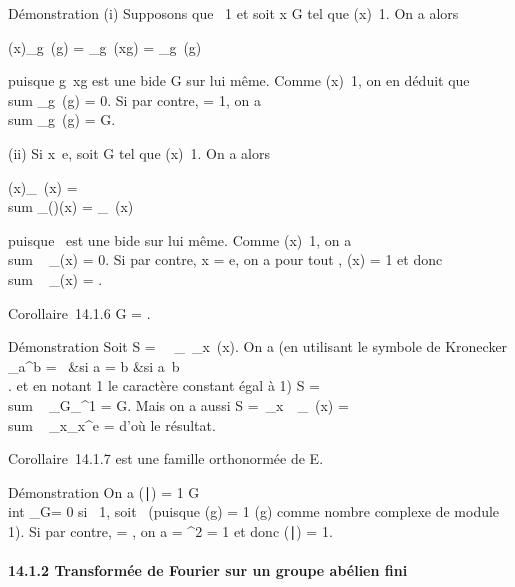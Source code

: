 \documentclass[]{article}
\begin{document}
Démonstration (i) Supposons que \chi\neq~1 et soit x
\in G tel que \chi(x)\neq~1. On a alors

\chi(x)\sum \_g\inG~\chi(g) =
\sum \_g\inG~\chi(xg) =
\sum \_g\inG~\chi(g)

puisque g\mapsto~xg est une bi\jmathection de G sur lui
même. Comme \chi(x)\neq~1, on en déduit que
\\sum  \_g\inG~\chi(g)
= 0. Si par contre, \chi = 1, on a
\\sum  \_g\inG~\chi(g)
= \textbar{}G\textbar{}.

(ii) Si x\neq~e, soit \phi \in\hat
G tel que \phi(x)\neq~1. On a alors

\phi(x)\sum \_\chi\in\hatG~\chi(x)
= \\sum
\_\chi\in\hatG(\phi\chi)(x) =
\sum \_\chi\in\hatG~\chi(x)

puisque \chi\mapsto~\phi\chi est une bi\jmathection de
\hatG sur lui même. Comme
\phi(x)\neq~1, on a
\\sum ~
\_\chi\in\hatG\chi(x) = 0. Si par contre, x = e, on a
pour tout \chi, \chi(x) = 1 et donc
\\sum ~
\_\chi\in\hatG\chi(x) =
\textbar{}\hatG\textbar{}.

Corollaire~14.1.6 \textbar{}G\textbar{} =
\textbar{}\hatG\textbar{}.

Démonstration Soit S =\
\sum ~
\_\chi\in\hatG\
\sum  \_x\inG~\chi(x). On a (en utilisant le
symbole de Kronecker \delta\_a^b = \left
\ \cases 1&si a = b
&si a\neq~b\\ 
\right . et en notant 1 le caractère constant égal à 1) S
= \\sum ~
\_\chi\in\hatG\textbar{}G\textbar{}\delta\_\chi^1
= \textbar{}G\textbar{}. Mais on a aussi S =\
\sum  \_x\inG~\
\sum  \_\chi\in\hatG~\chi(x)
= \\sum ~
\_x\inG\textbar{}\hatG\textbar{}\delta\_x^e
= \textbar{}\hatG\textbar{} d'où le résultat.

Corollaire~14.1.7 \hatG est une famille orthonormée
de E.

Démonstration On a (\chi∣\phi) = 1
\over \textbar{}G\textbar{} \\int
 \_G\overline\chi\phi = 0 si
\overline\chi\phi\neq~1, soit
\chi\neq~\phi (puisque \overline\chi(g)
= 1 \over \chi(g) comme nombre complexe de module 1). Si
par contre, \chi = \phi, on a \overline\chi\phi =
\textbar{}\chi\textbar{}^2 = 1 et donc
(\chi∣\phi) = 1.

\paragraph{14.1.2 Transformée de Fourier sur un groupe abélien fini}
\end{document}

